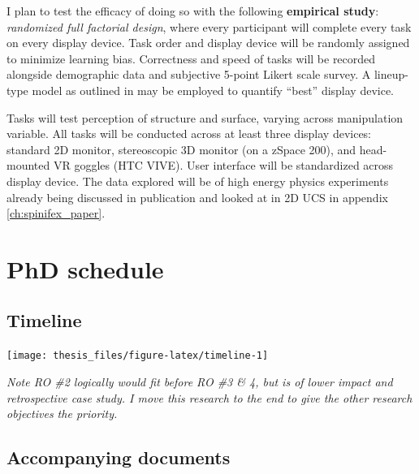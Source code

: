 \documentclass{monashthesis}
\begin{document}
I plan to test the efficacy of doing so with the following
\textbf{empirical study}: \emph{randomized full factorial design}, where
every participant will complete every task on every display device. Task
order and display device will be randomly assigned to minimize learning
bias. Correctness and speed of tasks will be recorded alongside
demographic data and subjective 5-point Likert scale survey. A
lineup-type model as outlined in \textcite{hofmann_graphical_2012} may
be employed to quantify ``best'' display device.

Tasks will test perception of structure and surface, varying across
manipulation variable. All tasks will be conducted across at least three
display devices: standard 2D monitor, stereoscopic 3D monitor (on a
zSpace 200), and head-mounted VR goggles (HTC VIVE). User interface will
be standardized across display device. The data explored will be of high
energy physics experiments already being discussed in publication
\autocites{wang_visualizing_2018}{cook_dynamical_2018} and looked at in
2D UCS in appendix \ref{ch:spinifex_paper}.

\chapter{PhD schedule}\label{ch:timeline}

\section{Timeline}\label{timeline}

\begin{center}\texttt{[image: thesis\_files/figure-latex/timeline-1]} \end{center}

\emph{Note RO \#2 logically would fit before RO \#3 \& 4, but is of
lower impact and retrospective case study. I move this research to the
end to give the other research objectives the priority.}

\section{Accompanying documents}\label{accompanying-documents}
\end{document}
